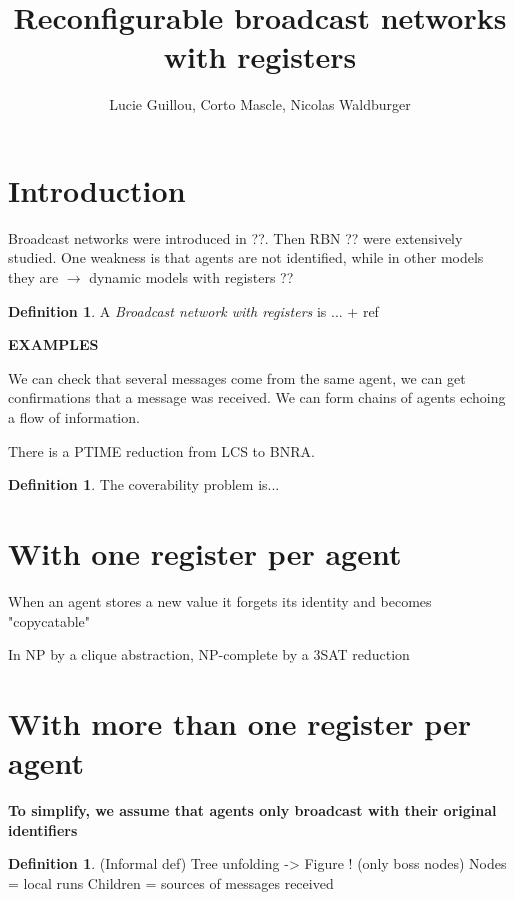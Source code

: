 \documentclass{article}
\title{Reconfigurable broadcast networks with registers}
\author{Lucie Guillou, Corto Mascle, Nicolas Waldburger}
\date{}
\theoremstyle{definition}
\newtheorem{definition}[theorem]{Definition}
\begin{document}
	
	\maketitle
	
	\section{Introduction}
	
	Broadcast networks were introduced in ??. Then RBN ?? were extensively studied. One weakness is that agents are not identified, while in other models they are $\to$ dynamic models with registers ??
	
	\begin{definition}
		A \emph{Broadcast network with registers} is ... + ref
	\end{definition}
	
	\textbf{EXAMPLES}
	
	We can check that several messages come from the same agent, we can get confirmations that a message was received.
	We can form chains of agents echoing a flow of information.
	
	\begin{theorem}
		There is a PTIME reduction from LCS to BNRA.
	\end{theorem}
	
	\begin{definition}
		The coverability problem is...
	\end{definition}
	
	\section{With one register per agent}
	
	When an agent stores a new value it forgets its identity and becomes "copycatable"
	
	In NP by a clique abstraction, NP-complete by a 3SAT reduction
	
	\section{With more than one register per agent}
	
	\textbf{To simplify, we assume that agents only broadcast with their original identifiers}
	
	\begin{definition}
		(Informal def) Tree unfolding -> Figure ! (only boss nodes)
		Nodes = local runs
		Children = sources of messages received
	\end{definition} 
	
\end{document}
